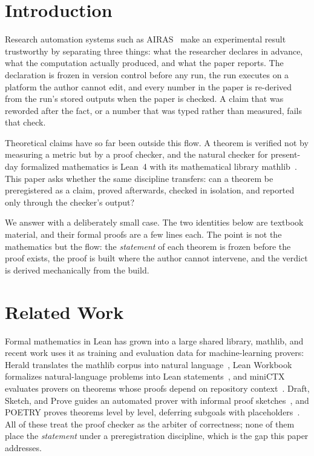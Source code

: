 \documentclass[journal,article,submit,pdftex,moreauthors]{Definitions/mdpi}
\begin{document}
\section{Introduction}

Research automation systems such as AIRAS~\cite{airas2025} make an experimental result trustworthy by separating three things: what the researcher declares in advance, what the computation actually produced, and what the paper reports. The declaration is frozen in version control before any run, the run executes on a platform the author cannot edit, and every number in the paper is re-derived from the run's stored outputs when the paper is checked. A claim that was reworded after the fact, or a number that was typed rather than measured, fails that check.

Theoretical claims have so far been outside this flow. A theorem is verified not by measuring a metric but by a proof checker, and the natural checker for present-day formalized mathematics is Lean~4 with its mathematical library mathlib~\cite{lean4,mathlib}. This paper asks whether the same discipline transfers: can a theorem be preregistered as a claim, proved afterwards, checked in isolation, and reported only through the checker's output?

We answer with a deliberately small case. The two identities below are textbook material, and their formal proofs are a few lines each. The point is not the mathematics but the flow: the \emph{statement} of each theorem is frozen before the proof exists, the proof is built where the author cannot intervene, and the verdict is derived mechanically from the build.

\section{Related Work}

Formal mathematics in Lean has grown into a large shared library, mathlib, and recent work uses it as training and evaluation data for machine-learning provers: Herald translates the mathlib corpus into natural language~\cite{gao-2025-herald}, Lean Workbook formalizes natural-language problems into Lean statements~\cite{ying-2024-lean}, and miniCTX evaluates provers on theorems whose proofs depend on repository context~\cite{hu-2025-minictx}. Draft, Sketch, and Prove guides an automated prover with informal proof sketches~\cite{jiang-2023-draft}, and POETRY proves theorems level by level, deferring subgoals with placeholders~\cite{wang-2024-proving}. All of these treat the proof checker as the arbiter of correctness; none of them place the \emph{statement} under a preregistration discipline, which is the gap this paper addresses.
\end{document}

